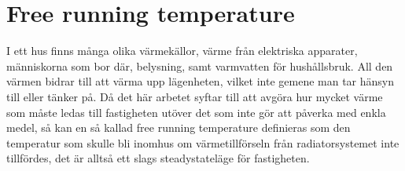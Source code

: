 \section{Free running temperature}
I ett hus finns många olika värmekällor, värme från elektriska apparater, människorna som bor där, belysning, samt varmvatten för hushållsbruk. All den värmen bidrar till att värma upp lägenheten, vilket inte gemene man tar hänsyn till eller tänker på. Då det här arbetet syftar till att avgöra hur mycket värme som måste ledas till fastigheten utöver det som inte gör att påverka med enkla medel, så kan en så kallad free running temperature definieras som den temperatur som skulle bli inomhus om värmetillförseln från radiatorsystemet inte tillfördes, det är alltså ett slags steadystateläge för fastigheten.
